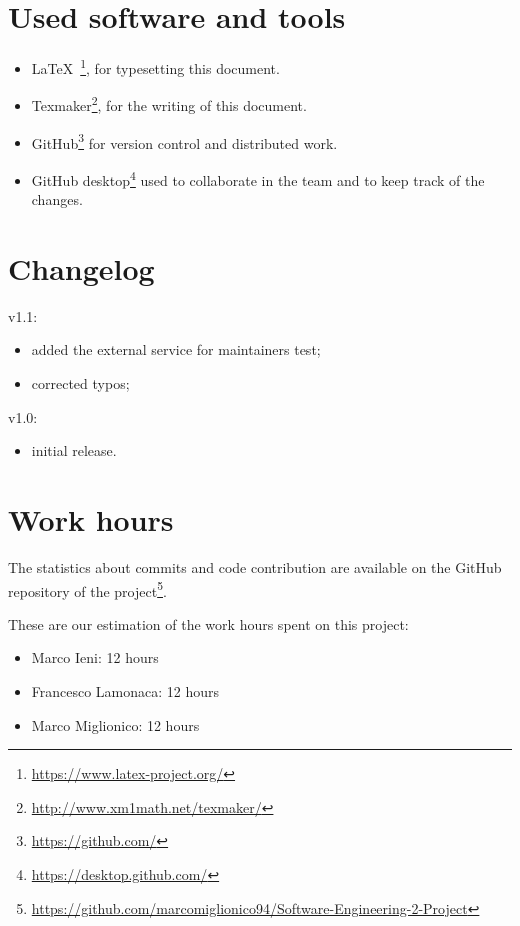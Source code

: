 \section{Used software and tools}
\begin{itemize}
    \item \LaTeX\ \footnote{\url{https://www.latex-project.org/}}, for typesetting this document.
    \item Texmaker\footnote{\url{http://www.xm1math.net/texmaker/}}, for the writing of this document.
    \item GitHub\footnote{\url{https://github.com/}} for version control and distributed work.
   \item GitHub desktop\footnote{\url{https://desktop.github.com/}} used to collaborate in the team and to keep track of the changes. 
\end{itemize}

\section{Changelog}

v1.1:
\begin{itemize}
\item added the external service for maintainers test;
\item corrected typos;
\end{itemize}

v1.0:
\begin{itemize}
\item initial release.
\end{itemize}



\section{Work hours}
The statistics about commits and code contribution are available on the GitHub repository of the project\footnote{\url{https://github.com/marcomiglionico94/Software-Engineering-2-Project}}.

These are our estimation of the work hours spent on this project:
\begin{itemize}
    \item Marco Ieni: 12 hours
    \item Francesco Lamonaca: 12 hours
    \item Marco Miglionico: 12 hours
\end{itemize}
